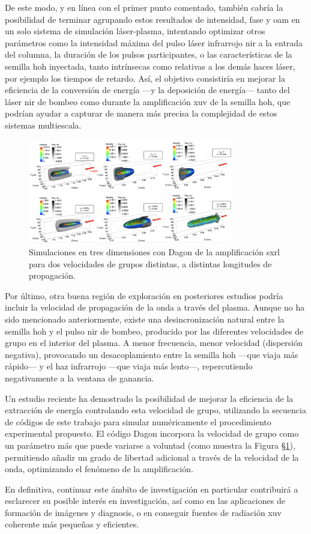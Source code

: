 De este modo, y en línea con el primer punto comentado, también cabría la posibilidad de terminar agrupando estos resultados de intensidad, fase y \acrshort{oam} en un solo sistema de simulación láser-plasma, intentando optimizar otros parámetros como la intensidad máxima del pulso láser infrarrojo \acrshort{nir} a la entrada del columna, la duración de los pulsos participantes, o las características de la semilla \acrshort{hoh} inyectada, tanto intrínsecas como relativas a los demás haces láser, por ejemplo los tiempos de retardo. Así, el objetivo consistiría en mejorar la eficiencia de la conversión de energía ---y la deposición de energía--- tanto del láser \acrshort{nir} de bombeo como durante la amplificación \acrshort{xuv} de la semilla \acrshort{hoh}, que podrían ayudar a capturar de manera más precisa la complejidad de estos sistemas multiescala.

\begin{figure}[htbp]
  \centering
  \includegraphics[width=0.8\textwidth]{Figuras/ch7_futuro.png}
  \caption{Simulaciones en tres dimensiones\autocite{Kabacinski2023} con Dagon de la amplificación \acrshort{sxrl} para dos velocidades de grupos distintas, a distintas longitudes de propagación.}
  \label{fig:7.1}
\end{figure}

Por último, otra buena región de exploración en posteriores estudios podría incluir la velocidad de propagación de la onda a través del plasma. Aunque no ha sido mencionado anteriormente, existe una desincronización natural entre la semilla \acrshort{hoh} y el pulso \acrshort{nir} de bombeo, producido por las diferentes velocidades de grupo en el interior del plasma. A menor frecuencia, menor velocidad (dispersión negativa), provocando un desacoplamiento entre la semilla \acrshort{hoh} ---que viaja más rápido--- y el haz infrarrojo ---que viaja más lento---, repercutiendo negativamente a la ventana de ganancia. 

Un estudio reciente\autocite{Kabacinski2023} ha demostrado la posibilidad de mejorar la eficiencia de la extracción de energía controlando esta velocidad de grupo, utilizando la secuencia de códigos de este trabajo para simular numéricamente el procedimiento experimental propuesto. El código Dagon incorpora la velocidad de grupo como un parámetro más que puede variarse a voluntad (como muestra la Figura \S\ref{fig:7.1}), permitiendo añadir un grado de libertad adicional a través de la velocidad de la onda, optimizando el fenómeno de la amplificación.

En definitiva, continuar este ámbito de investigación en particular contribuirá a esclarecer su posible interés en investigación, así como en las aplicaciones de formación de imágenes y diagnosis, o en conseguir fuentes de radiación \acrshort{xuv} coherente más pequeñas y eficientes. 
